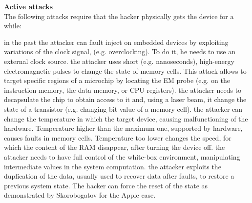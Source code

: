 \textbf{Active attacks}\\
The following attacks require that the hacker physically gets the device for a while:
\begin{itemize}
{in the past the attacker can fault inject on embedded devices by exploiting variations of the clock signal, (e.g. overclocking). To do it, he needs to use an external clock source.}
{the attacker uses short (e.g. nanoseconds), high-energy electromagnetic pulses to change the state of memory cells. This attack allows to target specific regions of a microchip by locating the EM probe (e.g. on the instruction memory, the data memory, or CPU registers).}
{the attacker needs to decapsulate the chip to obtain access to it and, using a laser beam, it change the state of a transistor (e.g. changing bit value of a memory cell).}
{the attacker can change the temperature in which the target device, causing malfunctioning of the hardware. Temperature higher than the maximum one, supported by hardware, causes faults in memory cells. Temperature too lower changes the speed, for which the content of the RAM disappear, after turning the device off.}
{the attacker needs to have full control of the white-box environment, manipulating intermediate values in the system computation.}
{the attacker exploits the duplication of the data, usually used to recover data after faults, to restore a previous system state. The hacker can force the reset of the state as demonstrated by Skorobogatov for the Apple case\cite{side_apple}.}
\end{itemize}


